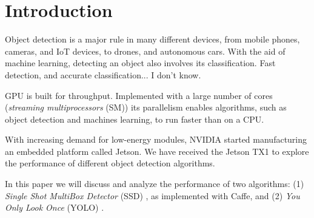 \section{Introduction}
\label{sec:intro}

Object detection is a major rule in many different devices, from mobile phones, cameras, and IoT devices, to drones, and autonomous cars. With the aid of machine learning, detecting an object also involves its classification. Fast detection, and accurate classification... I don't know.

GPU is built for throughput. Implemented with a large number of cores (\textit{streaming multiprocessors} (SM)) its parallelism enables algorithms, such as object detection and machines learning, to run faster than on a CPU.

With increasing demand for low-energy modules, NVIDIA started manufacturing an embedded platform called Jetson. We have received the Jetson TX1 to explore the performance of different object detection algorithms.

In this paper we will discuss and analyze the performance of two algorithms: (1) \textit{Single Shot MultiBox Detector} (SSD) \cite{liu2016ssd}, as implemented with Caffe, and (2) \textit{You Only Look Once} (YOLO) \cite{redmon2016you}.



